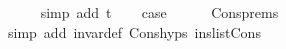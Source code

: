 \begin{isabellebody}
\ \ \ \ \isamarkupfalse%
\ {\isacharparenleft}{\kern0pt}simp\ add{\isacharcolon}{\kern0pt}\ t{\isacharparenleft}{\kern0pt}{}{\isacharparenright}{\kern0pt}{\isacharparenright}{\kern0pt}\isanewline
\ \ \isamarkupfalse%
\ {\isacharquery}{\kern0pt}case\isanewline
\ \ \ \ \isamarkupfalse%
\ Cons{\isachardot}{\kern0pt}prems\isanewline
\ \ \ \ \isamarkupfalse%
\ {\isacharparenleft}{\kern0pt}simp\ add{\isacharcolon}{\kern0pt}\ invar{\isacharunderscore}{\kern0pt}def\ Cons{\isachardot}{\kern0pt}hyps{\isacharparenleft}{\kern0pt}{}{\isacharparenright}{\kern0pt}\ ins{\isacharunderscore}{\kern0pt}list{\isacharunderscore}{\kern0pt}Cons{\isacharparenright}{\kern0pt}\isanewline
{}\isamarkupfalse%
%
\endisatagproof
{\isafoldproof}%
%
\isadelimproof
\isanewline
%
\endisadelimproof
%
\isadeliminvisible
\isanewline
%
\endisadeliminvisible
%
\isataginvisible
{}\isamarkupfalse%
%
\endisataginvisible
{\isafoldinvisible}%
%
\isadeliminvisible
%
\endisadeliminvisible
%
\end{isabellebody}%
\endinput
